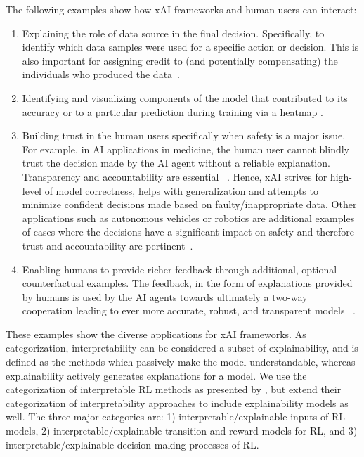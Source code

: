 \documentclass[twoside,11pt]{article}
\begin{document}
The following examples show how xAI frameworks and human users can interact:
\begin{enumerate}
\item Explaining the role of data source in the final decision. Specifically, to identify which data samples were used for a specific action or decision. This is also important for assigning credit to (and potentially compensating) the individuals who produced the data~\citep{zanzotto2019human}. 
\item Identifying and visualizing components of the model that contributed to its accuracy or to a particular prediction during training via a heatmap \citep{SturmEtAl:2015:InteractiveHeatmap}.
\item Building trust in the human users specifically when safety is a major issue. For example, in AI applications in medicine, the human user cannot blindly trust the decision made by the AI agent without a reliable explanation. Transparency and accountability are essential ~\citep{Schneeberger:2020:legalAI, Stoeger:2021:MedicalAI}. Hence, xAI strives for high-level of model correctness, helps with generalization and attempts to minimize confident decisions made based on faulty/inappropriate data. Other applications such as autonomous vehicles or robotics are additional examples of cases where the decisions have a significant impact on safety and therefore trust and accountability are pertinent~\citep{araiza2019safe, WellsBednarz:2021:xAIRLSurvey}.
\item Enabling humans to provide richer feedback through additional, optional counterfactual examples. The feedback, in the form of explanations provided by humans is used by the AI agents towards ultimately a two-way cooperation leading to ever more accurate, robust, and transparent models ~\citep{Karalus:2021:HITL-counterfactuals,PuiuttaVeith:2020:xAIRLSurvey}.   
\end{enumerate}

These examples show the diverse applications for xAI frameworks. As categorization, interpretability can be considered a subset of explainability, and is defined as the methods which passively make the model understandable, whereas explainability actively generates explanations for a model. We use the categorization of interpretable RL methods as presented by \citet{GlanoisEtAl:2021:SurveyInterpretableRL}, but extend their categorization of interpretability approaches to include explainability models as well. The three major categories are: 1) interpretable/explainable inputs of RL models, 2) interpretable/explainable transition and reward models for RL, and 3) interpretable/explainable decision-making processes of RL. 
\end{document}
